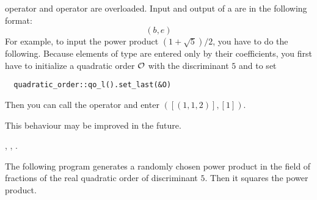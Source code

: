 operator \code{>>} and  operator \code{<<} are overloaded.  Input
and output of a  are in the following format:
\begin{displaymath}
  (b, e)
\end{displaymath}
For example, to input the power product $(1 + \sqrt{5})/2$, you have to do the following.
Because elements of type  are entered only by their coefficients,
you first have to initialize a quadratic order $\mathcal{O}$ with the discriminant $5$ and to set
\begin{verbatim}
  quadratic_order::qo_l().set_last(&O)
\end{verbatim}
Then you can call the operator \code{>>} and enter $( [(1,1,2)], [1] )$.

This behaviour may be improved in the future.



\SEEALSO

, , .



\EXAMPLES

The following program generates a randomly chosen power product in the field of fractions of the
real quadratic order of discriminant $5$.  Then it squares the power product.

